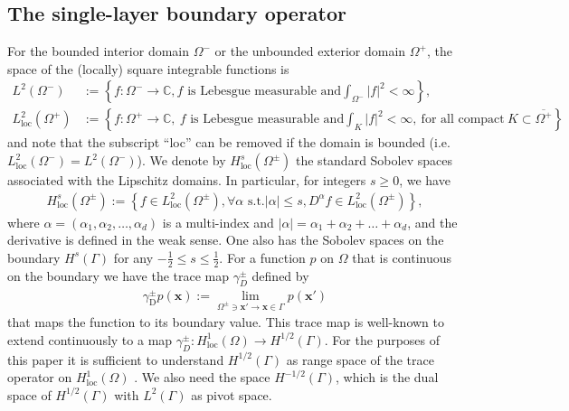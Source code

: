 \subsection{The single-layer boundary operator}
For the bounded interior domain $\Omega^{-}$ or the unbounded exterior domain $\Omega^{+}$, the space of the (locally) square integrable functions is 
\begin{align*}
    L^{2}(\Omega^{-}) &:= \left\{f:\Omega^{-}\rightarrow\mathbb{C}, f \text{ is Lebesgue measurable and} \int_{\Omega^{-}}|f|^{2} < \infty \right\},\\
    L_{\text{loc}}^{2}(\Omega^{+}) &:= \left\{f:\Omega^{+}\rightarrow\mathbb{C},\ f \text{ is Lebesgue measurable and} \int_{K}|f|^{2} < \infty, \ \text{for all compact}\ K \subset \overline{\Omega^{+}} \right\}
\end{align*}
and note that the subscript ``loc'' can be removed if the domain is bounded (i.e. $L_{\text{loc}}^{2}(\Omega^{-}) = L^{2}(\Omega^{-})$).
We denote by $H_{\text{loc}}^{s}(\Omega^{\pm})$ the standard Sobolev spaces associated with the Lipschitz domains. In particular, for integers $s\geq 0$, we have 
\begin{align*}
    H_{\text{loc}}^{s}(\Omega^{\pm}):=\left\{f\in L_{\text{loc}}^{2}(\Omega^{\pm}), \forall\alpha \text{ s.t.} |\alpha|\leq s, D^{\alpha}f\in L_{\text{loc}}^{2}(\Omega^{\pm})\right\},
\end{align*}
where $\alpha = (\alpha_{1}, \alpha_{2}, \dots, \alpha_{d})$ is a multi-index and $|\alpha| = \alpha_{1} + \alpha_{2} + \dots + \alpha_{d}$, and 
the derivative is defined in the weak sense.
One also has the Sobolev spaces on the boundary $H^{s}(\Gamma)$ for any $-\frac{1}{2} \leq s \leq \frac{1}{2}$.
For a function $p$ on $\Omega$ that is continuous on the boundary we have the trace map $\gamma_{D}^{\pm}$ defined by
\begin{align*}
    \gamma_{\text{D}}^{\pm}p(\boldsymbol{x}):=\lim_{\Omega^{\pm}\ni\boldsymbol{x'}\rightarrow\boldsymbol{x}\in\Gamma}p(\boldsymbol{x'})
\end{align*}
that maps the function to its boundary value. This trace map is well-known to extend continuously to a map
$\gamma_{D}^{\pm}:  H_{\text{loc}}^1(\Omega) \to H^{1/2}(\Gamma) $. For the purposes of this paper it is sufficient to understand $H^{1/2}(\Gamma)$ as range space of the trace operator on $H_{\text{loc}}^1(\Omega)$ . We also need the space $H^{-1/2}(\Gamma)$, which is the dual space of $H^{1/2}(\Gamma)$ with $L^2(\Gamma)$ as pivot space.

